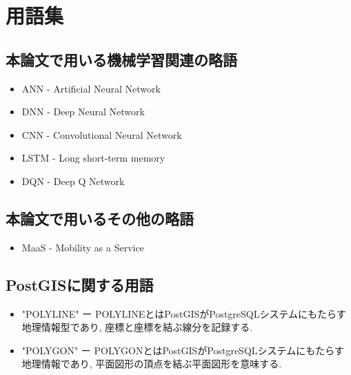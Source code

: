 \chapter*{用語集}


\section*{本論文で用いる機械学習関連の略語}

\begin{itemize}
    \item ANN   - Artificial Neural Network
    \item DNN   - Deep Neural Network
    \item CNN   - Convolutional Neural Network
    \item LSTM  - Long short-term memory
    \item DQN   - Deep Q Network
\end{itemize}


\section*{本論文で用いるその他の略語}

\begin{itemize}
    \item MaaS - Mobility as a Service
\end{itemize}


\section*{PostGISに関する用語}


\begin{itemize}
    \item "POLYLINE" ー POLYLINEとはPostGISがPostgreSQLシステムにもたらす地理情報型であり, 座標と座標を結ぶ線分を記録する.
    \item "POLYGON"  ー POLYGONとはPostGISがPostgreSQLシステムにもたらす地理情報であり, 平面図形の頂点を結ぶ平面図形を意味する.
\end{itemize}